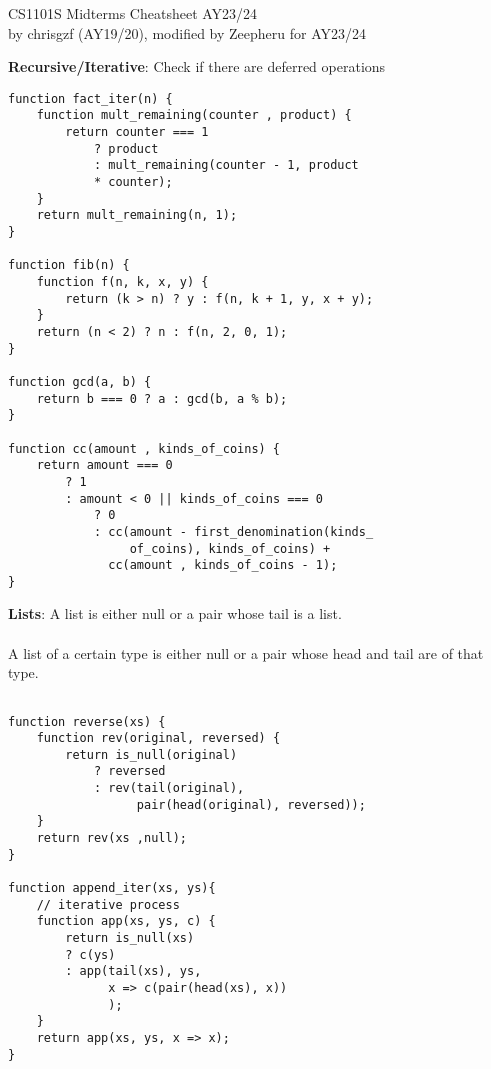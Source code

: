 \documentclass[a4paper]{article} \usepackage[backend=biber, style=numeric, sorting=none]{biblatex}
\begin{document}
\setlength\parindent{0pt} %
\scriptsize
{}

\newcommand{\divider}{\noindent\makebox[\linewidth]{\rule{\columnwidth}{0.4pt}}}

\begin{center}
{\large CS1101S Midterms Cheatsheet AY23/24}\\{by chrisgzf (AY19/20), modified by Zeepheru for AY23/24}
\end{center}
    \begin{multicols*}{4}

{\small\textbf{Recursive/Iterative}}: Check if there are deferred operations

\begin{verbatim}
function fact_iter(n) {
    function mult_remaining(counter , product) {
        return counter === 1
            ? product
            : mult_remaining(counter - 1, product
            * counter);
    }
    return mult_remaining(n, 1);
}

function fib(n) {
    function f(n, k, x, y) {
        return (k > n) ? y : f(n, k + 1, y, x + y);
    }
    return (n < 2) ? n : f(n, 2, 0, 1);
}

function gcd(a, b) {
    return b === 0 ? a : gcd(b, a % b);
}

function cc(amount , kinds_of_coins) {
    return amount === 0
        ? 1
        : amount < 0 || kinds_of_coins === 0
            ? 0
            : cc(amount - first_denomination(kinds_
                 of_coins), kinds_of_coins) +
              cc(amount , kinds_of_coins - 1);
}
\end{verbatim}
{\small\textbf{Lists}}: A list is either null or a pair whose tail is a list.
\\ \\
A list of a certain type is either null or a pair whose head and tail are of that type.

\begin{verbatim}

function reverse(xs) {
    function rev(original, reversed) {
        return is_null(original)
            ? reversed
            : rev(tail(original),
                  pair(head(original), reversed));
    }
    return rev(xs ,null);
}

function append_iter(xs, ys){
    // iterative process
    function app(xs, ys, c) {
        return is_null(xs)
        ? c(ys)
        : app(tail(xs), ys, 
              x => c(pair(head(xs), x))
              );
    }
    return app(xs, ys, x => x);
}





\end{verbatim}
\end{multicols*}
\end{document}
